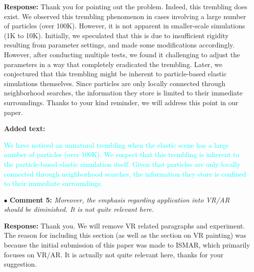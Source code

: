 \documentclass[12pt,a4paper]{article}
\newcommand{\revised}[1]{\textcolor{cyan}{#1}}
\begin{document}
\vspace{0.2cm}
\textbf{Response:}
Thank you for pointing out the problem. Indeed, this trembling does exist. We observed this trembling phenomenon in cases involving a large number of particles (over 100K). However, it is not apparent in smaller-scale simulations (1K to 10K). Initially, we speculated that this is due to insufficient rigidity resulting from parameter settings, and made some modifications accordingly. However, after conducting multiple tests, we found it challenging to adjust the parameters in a way that completely eradicated the trembling. Later, we conjectured that this trembling might be inherent to particle-based elastic simulations themselves. Since particles are only locally connected through neighborhood searches, the information they store is limited to their immediate surroundings. %
Thanks to your kind reminder, we will address this point in our paper.

\vspace{0.2cm}
\textbf{Added text:}

\revised{We have noticed an unnatural trembling when the elastic scene has a large number of particles (over 100K).%
We suspect that this trembling is inherent to the particle-based elastic simulation itself. Given that particles are only locally connected through neighborhood searches, the information they store is confined to their immediate surroundings. %
}



\vspace{0.4cm}
\noindent$\bullet$ \enspace \textbf{Comment 5:}
\textit{Moreover, the emphasis regarding application into VR/AR should be diminished. It is not quite relevant here.}


\vspace{0.2cm}
\textbf{Response:}
Thank you. We will remove VR related paragraphs and experiment. The reason for including this section (as well as the section on VR painting) was because the initial submission of this paper was made to ISMAR, which primarily focuses on VR/AR. It is actually not quite relevant here, thanks for your suggestion.
\end{document}
